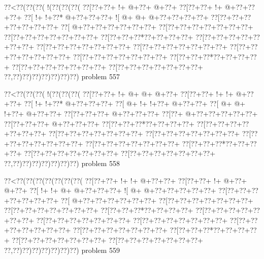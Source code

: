 \vbox{\vbox{\goo
\0??<\0??(\0??(\0??(\- !(\0??(\0??(\0??(
\0??[\0??+\0??+\- !+\- @+\0??+\- @+\0??+
\0??[\0??+\0??+\- !+\- @+\0??+\0??+\0??+
\0??[\- !+\- !+\0??*\- @+\0??+\0??+\0??+
\- ![\- @+\- @+\- @+\0??+\0??+\0??+\0??+
\0??[\0??+\0??+\0??+\0??+\0??+\0??+\0??+
\0??[\- @+\0??+\0??+\0??+\0??+\0??+\0??+
\0??[\0??+\0??+\0??+\0??+\0??+\0??+\0??+
\0??[\0??+\0??+\0??+\0??+\0??+\0??+\0??+
\0??[\0??+\0??+\0??*\0??+\0??+\0??+\0??+
\0??[\0??+\0??+\0??+\0??+\0??+\0??+\0??+
\0??[\0??+\0??+\0??+\0??+\0??+\0??+\0??+
\0??[\0??+\0??+\0??+\0??+\0??+\0??+\0??+
\0??[\0??+\0??+\0??+\0??+\0??+\0??+\0??+
\0??[\0??+\0??+\0??+\0??+\0??+\0??+\0??+
\0??[\0??+\0??+\0??*\0??+\0??+\0??+\0??+
\0??[\0??+\0??+\0??+\0??+\0??+\0??+\0??+
\0??[\0??+\0??+\0??+\0??+\0??+\0??+\0??+
\0??,\0??)\0??)\0??)\0??)\0??)\0??)\0??)
}
\hfil problem 557\hfil\break
}

\vbox{\vbox{\goo
\0??<\0??(\0??(\0??(\- !(\0??(\0??(\0??(
\0??[\0??+\0??+\- !+\- @+\- @+\- @+\0??+
\0??[\0??+\0??+\- !+\- !+\- @+\0??+\0??+
\0??[\- !+\- !+\0??*\- @+\0??+\0??+\0??+
\0??[\- @+\- !+\- !+\0??+\- @+\0??+\0??+
\0??[\- @+\- @+\- !+\0??+\- @+\0??+\0??+
\0??[\0??+\0??+\0??+\- @+\0??+\0??+\0??+
\0??[\0??+\- @+\0??+\0??+\0??+\0??+\0??+
\0??[\0??+\0??+\0??+\- @+\0??+\0??+\0??+
\0??[\0??+\0??+\0??*\0??+\0??+\0??+\0??+
\0??[\0??+\0??+\0??+\0??+\0??+\0??+\0??+
\0??[\0??+\0??+\0??+\0??+\0??+\0??+\0??+
\0??[\0??+\0??+\0??+\0??+\0??+\0??+\0??+
\0??[\0??+\0??+\0??+\0??+\0??+\0??+\0??+
\0??[\0??+\0??+\0??+\0??+\0??+\0??+\0??+
\0??[\0??+\0??+\0??*\0??+\0??+\0??+\0??+
\0??[\0??+\0??+\0??+\0??+\0??+\0??+\0??+
\0??[\0??+\0??+\0??+\0??+\0??+\0??+\0??+
\0??,\0??)\0??)\0??)\0??)\0??)\0??)\0??)
}
\hfil problem 558\hfil\break
}

\vbox{\vbox{\goo
\0??<\0??(\0??(\0??(\0??(\0??(\0??(\0??(
\0??[\0??+\0??+\- !+\- !+\- @+\0??+\0??+
\0??[\0??+\0??+\- !+\- @+\0??+\- @+\0??+
\0??[\- !+\- !+\- @+\- @+\0??+\0??+\0??+
\- ![\- @+\- @+\0??+\0??+\0??+\0??+\0??+
\0??[\0??+\0??+\0??+\0??+\0??+\0??+\0??+
\0??[\- @+\0??+\0??+\0??+\0??+\0??+\0??+
\0??[\0??+\0??+\0??+\0??+\0??+\0??+\0??+
\0??[\0??+\0??+\0??+\0??+\0??+\0??+\0??+
\0??[\0??+\0??+\0??*\0??+\0??+\0??+\0??+
\0??[\0??+\0??+\0??+\0??+\0??+\0??+\0??+
\0??[\0??+\0??+\0??+\0??+\0??+\0??+\0??+
\0??[\0??+\0??+\0??+\0??+\0??+\0??+\0??+
\0??[\0??+\0??+\0??+\0??+\0??+\0??+\0??+
\0??[\0??+\0??+\0??+\0??+\0??+\0??+\0??+
\0??[\0??+\0??+\0??*\0??+\0??+\0??+\0??+
\0??[\0??+\0??+\0??+\0??+\0??+\0??+\0??+
\0??[\0??+\0??+\0??+\0??+\0??+\0??+\0??+
\0??,\0??)\0??)\0??)\0??)\0??)\0??)\0??)
}
\hfil problem 559\hfil\break
}

